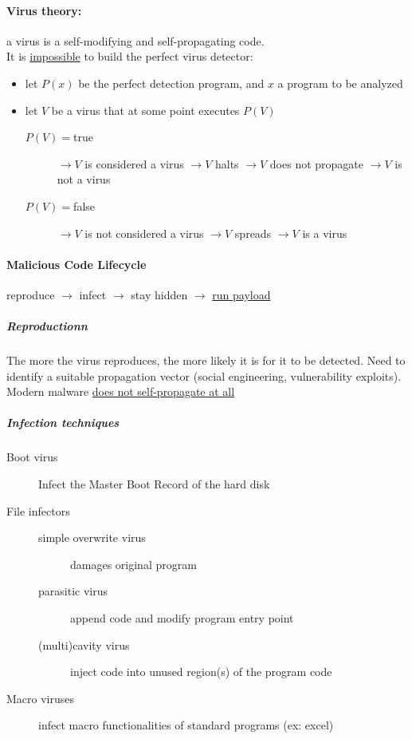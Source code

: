 \documentclass{article}
\begin{document}
\begin{description}
\paragraph{Virus theory:} a virus is a self-modifying and self-propagating code. \\
It is \underline{impossible} to build the perfect virus detector:
\begin{itemize}
\item let $P(x)$ be the perfect detection program, and $x$ a program to be analyzed
\item let $V$ be a virus that at some point executes $P(V)$
	\begin{description}
	\item[$P(V)=$true]
	$\rightarrow V$ is considered a virus
	$\rightarrow V$ halts 
	$\rightarrow V$ does not propagate
	$\rightarrow V$ is not a virus
	\item[$P(V)=$false]
	$\rightarrow V$ is not considered a virus
	$\rightarrow V$ spreads
	$\rightarrow V$ is a virus
	\end{description}
\end{itemize}
\end{description}
\paragraph{Malicious Code Lifecycle}
reproduce $\rightarrow$ infect $\rightarrow$ stay hidden $\rightarrow$ \underline{run payload}
\subparagraph{Reproductionn} The more the virus reproduces, the more likely it is for it to be detected. Need to identify a suitable propagation vector (social engineering, vulnerability exploits). Modern malware \underline{does not self-propagate at all}
\subparagraph{Infection techniques}
\begin{description}
\item[Boot virus] Infect the Master Boot Record of the hard disk
\item[File infectors]
	\begin{description}
	\item[simple overwrite virus] damages original program
	\item[parasitic virus] append code and modify program entry point
	\item[(multi)cavity virus] inject code into unused region(s) of the program code
	\end{description}
\item[Macro viruses] infect macro functionalities of standard programs (ex: excel)
\end{description}
\end{document}
